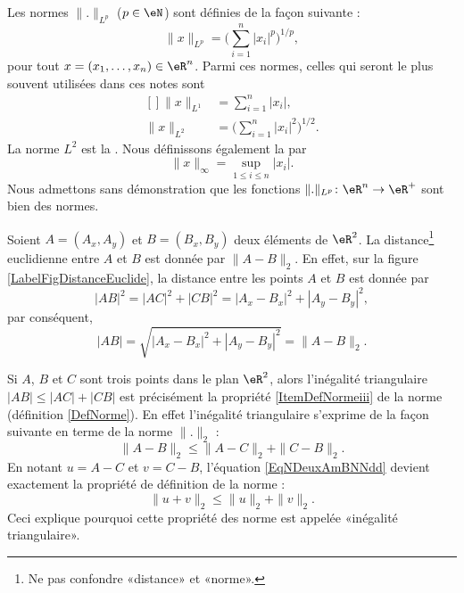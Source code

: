Les normes $\| . \|_{L^p}$ ($p\in\eN$) sont définies de la façon suivante :
\begin{equation}		\label{EqDeformeLp}
	\| x \|_{L^p}=\Big( \sum_{i=1}^n| x_i |^p\Big)^{1/p},
\end{equation}
pour tout $x=(x_1,\ldots,x_n)\in\eR^n$. Parmi ces normes, celles qui seront le plus souvent utilisées dans ces notes sont
\begin{equation}
	\begin{aligned}[]
		\| x \|_{L^1}&=\sum_{i=1}^n| x_i |,\\
		\| x \|_{L^2}&=\Big( \sum_{i=1}^n| x_i |^2 \Big)^{1/2}.
	\end{aligned}
\end{equation}
La norme $L^2$ est la . Nous définissons également la  par
\begin{equation}
	\| x \|_{\infty}=\sup_{1\leq i\leq n}| x_i |.
\end{equation}
Nous admettons sans démonstration que les fonctions $\| . \|_{L^p}\colon \eR^n\to \eR^+$ sont bien des normes.

\newcommand{\CaptionFigDistanceEuclide}{La \emph{norme} euclidienne induit la \emph{distance} euclidienne. D'où son nom. Le point $C$ est construit aux coordonnées $(A_x,B_y)$.}


Soient $A=(A_x,A_y)$ et $B=(B_x,B_y)$ deux éléments de $\eR^2$. La distance\footnote{Ne pas confondre «distance» et «norme».} euclidienne entre $A$ et $B$ est donnée par $\| A-B \|_2$. En effet, sur la figure \ref{LabelFigDistanceEuclide}, la distance entre les points $A$ et $B$ est donnée par
\begin{equation}
	| AB |^2=| AC |^2+| CB |^2=| A_x-B_x |^2+| A_y-B_y |^2,
\end{equation}
par conséquent,
\begin{equation}
	| AB |=\sqrt{| A_x-B_x |^2+| A_y-B_y |^2}=\| A-B \|_2.
\end{equation}

\begin{remark}
	Si $A$, $B$ et $C$ sont trois points dans le plan $\eR^2$, alors l'inégalité triangulaire $| AB |\leq| AC |+| CB |$ est précisément la propriété \ref{ItemDefNormeiii} de la norme (définition \ref{DefNorme}). En effet l'inégalité triangulaire s'exprime de la façon suivante en terme de la norme $\| . \|_2$ :
	\begin{equation}	\label{EqNDeuxAmBNNdd}
		\| A-B \|_2\leq \| A-C \|_2+\| C-B \|_2.
	\end{equation}
	En notant $u=A-C$ et $v=C-B$, l'équation \eqref{EqNDeuxAmBNNdd} devient exactement la propriété de définition de la norme :
	\begin{equation}
		\| u+v \|_2\leq \| u \|_2+\| v \|_2.
	\end{equation}
	Ceci explique pourquoi cette propriété des norme est appelée «inégalité triangulaire».
\end{remark}

